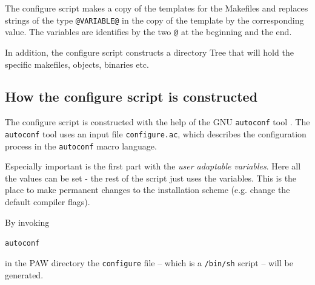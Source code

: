 \documentclass[a4paper,10pt]{report}
\newcommand{\mytt}[1]{{\tt #1}}
\begin{document}
The configure script makes a copy of the templates for the Makefiles
and replaces strings of the type \mytt{@VARIABLE@} in the copy of the
template by the corresponding value. The variables are identifies by
the two \mytt{@} at the beginning and the end.

In addition, the configure script constructs a directory Tree that will
hold the specific makefiles, objects, binaries etc.

\subsection{How the configure script is constructed}

The configure script is constructed with the help of the GNU
\mytt{autoconf} tool . The \mytt{autoconf} tool uses an input file
\mytt{configure.ac}, which describes the configuration process in the
\mytt{autoconf} macro language.

Especially important is the first part with the \emph{user adaptable
variables}. Here all the values can be set - the rest of the script just uses
the variables.  This is the place to make permanent changes to the installation
scheme (e.g. change the default compiler flags).

By invoking
\begin{center}
\mytt{autoconf}
\end{center}
in the PAW directory the \texttt{configure} file -- which is a
\texttt{/bin/sh} script -- will be generated.


\appendix
\newpage
\end{document}
